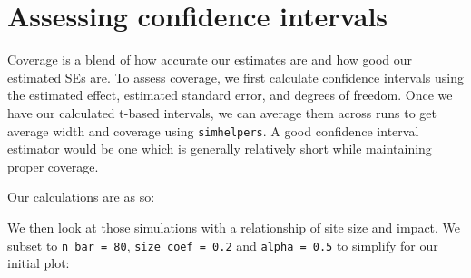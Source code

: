 \documentclass[
]{book}
\newenvironment{Shaded}{\begin{snugshade}}{\end{snugshade}}
\newcommand{\AttributeTok}[1]{\textcolor[rgb]{0.13,0.29,0.53}{#1}}
\newcommand{\FloatTok}[1]{\textcolor[rgb]{0.00,0.00,0.81}{#1}}
\newcommand{\FunctionTok}[1]{\textcolor[rgb]{0.13,0.29,0.53}{\textbf{#1}}}
\newcommand{\NormalTok}[1]{#1}
\newcommand{\OtherTok}[1]{\textcolor[rgb]{0.56,0.35,0.01}{#1}}
\newcommand{\SpecialCharTok}[1]{\textcolor[rgb]{0.81,0.36,0.00}{\textbf{#1}}}
\begin{document}
\section{Assessing confidence intervals}\label{assessing-confidence-intervals}

Coverage is a blend of how accurate our estimates are and how good our estimated SEs are.
To assess coverage, we first calculate confidence intervals using the estimated effect, estimated standard error, and degrees of freedom.
Once we have our calculated t-based intervals, we can average them across runs to get average width and coverage using \texttt{simhelpers}.
A good confidence interval estimator would be one which is generally relatively short while maintaining proper coverage.

Our calculations are as so:

\begin{Shaded}
\end{Shaded}

We then look at those simulations with a relationship of site size and impact.
We subset to \texttt{n\_bar\ =\ 80}, \texttt{size\_coef\ =\ 0.2} and \texttt{alpha\ =\ 0.5} to simplify for our initial plot:
\end{document}
